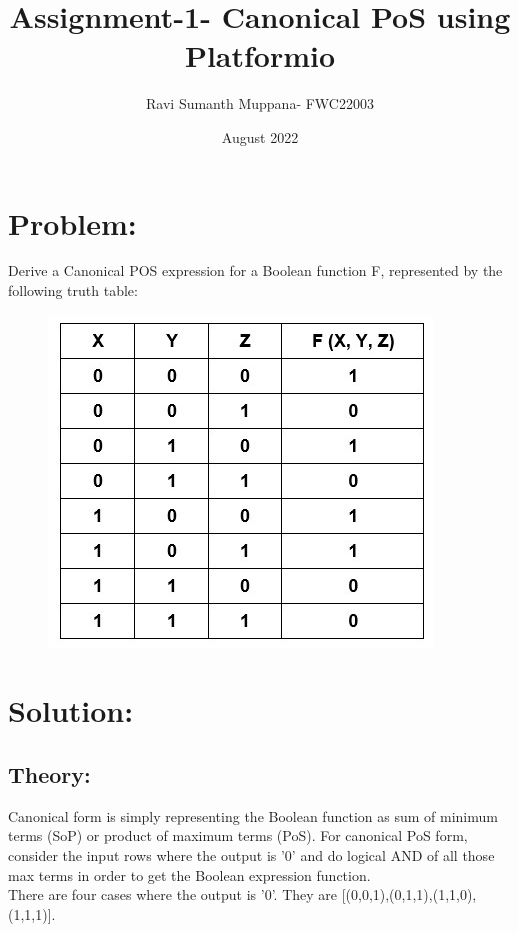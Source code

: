 \documentclass[a4paper,12pt,twocolumn]{article}
\title{Assignment-1- Canonical PoS using Platformio}
\author{Ravi Sumanth Muppana- FWC22003}
\date{August 2022}
\begin{document}
\maketitle

\section{Problem:}
Derive a Canonical POS expression for a Boolean function F, represented by the following truth table:

\begin{figure}[h]
\centering
\includegraphics[width=1.0\columnwidth]{TT-document}
\label{Truth Table}
\end{figure}
\maketitle\section{Solution:}
\subsection{Theory:}
Canonical form is simply representing the Boolean function as sum of minimum terms (SoP) or product of maximum terms (PoS). For canonical PoS form, consider the input rows where the output is '0' and do logical AND of all those max terms in order to get the Boolean expression function.\\
There are four cases where the output is '0'. They are [(0,0,1),(0,1,1),(1,1,0),(1,1,1)]. 
\end{document}
